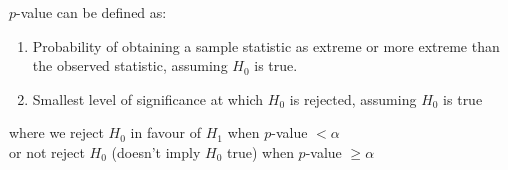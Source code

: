 \documentclass[12pt, a4paper]{article}
\begin{document}
\begin{multicols*}{3}
$p$-value can be defined as:
\begin{enumerate}[\roman*.]
  \item Probability of obtaining a sample statistic as extreme or more extreme than the observed statistic, assuming $H_0$ is true.
  \item Smallest level of significance at which $H_0$ is rejected, assuming $H_0$ is true
\end{enumerate}
where we reject $H_0$ in favour of $H_1$ when $p$-value $< \alpha$\\
or not reject $H_0$ (doesn't imply $H_0$ true) when $p$-value $\geq \alpha$

\end{multicols*}
\end{document}
